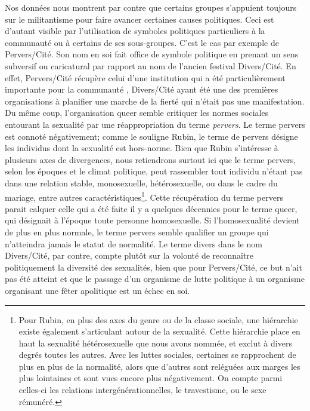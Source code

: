 Nos données nous montrent par contre que certains groupes s'appuient toujours sur le militantisme pour faire avancer certaines causes politiques.
Ceci est d'autant visible par l'utilisation de symboles politiques particuliers à la communauté \lgbt{} ou à certains de ses sous-groupes.
C'est le cas par exemple de Pervers/Cité.
Son nom en soi fait office de symbole politique en prenant un sens subversif ou caricatural par rapport au nom de l'ancien festival Divers/Cité.
En effet, Pervers/Cité récupère celui d'une institution qui a été particulièrement importante pour la communauté \lgbt{}, Divers/Cité ayant été une des premières organisations à planifier une marche de la fierté qui n'était pas une manifestation.\missref{}
Du même coup, l'organisation queer semble critiquer les normes sociales entourant la sexualité par une réappropriation du terme \emph{pervers}.
Le terme pervers est connoté négativement; comme le souligne Rubin, le terme de pervers désigne les individus dont la sexualité est hors-norme.
Bien que Rubin s'intéresse à plusieurs axes de divergences, nous retiendrons surtout ici que le terme pervers, selon les époques et le climat politique, peut rassembler tout individu n'étant pas dans une relation stable, monosexuelle, hétérosexuelle, ou dans le cadre du mariage, entre autres caractéristiques\footnote{Pour Rubin, en plus des axes du genre ou de la classe sociale, une hiérarchie existe également s'articulant autour de la sexualité. 
  Cette hiérarchie place en haut la sexualité hétérosexuelle que nous avons nommée, et exclut à divers degrés toutes les autres. 
  Avec les luttes sociales, certaines se rapprochent de plus en plus de la normalité, alors que d'autres sont reléguées aux marges les plus lointaines et sont vues encore plus négativement. 
  On compte parmi celles-ci les relations intergénérationnelles, le travestisme, ou le sexe rémunéré.
}.
Cette récupération du terme pervers parait calquer celle qui a été faite il y a quelques décennies pour le terme queer, qui désignait à l'époque toute personne homosexuelle.
Si l'homosexualité devient de plus en plus normale, le terme pervers semble qualifier un groupe qui n'atteindra jamais le statut de normalité.
Le terme divers dans le nom Divers/Cité, par contre, compte plutôt sur la volonté de reconnaître politiquement la diversité des sexualités, bien que pour Pervers/Cité, ce but n'ait pas été atteint et que le passage d'un organisme de lutte politique à un organisme organisant une fêter apolitique est un échec en soi.

